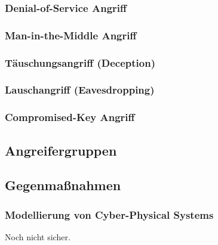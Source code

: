 \documentclass[final,bibliography=totocnumbered]{include/sikseminar}
\begin{document}
\subsubsection{Denial-of-Service Angriff}
\subsubsection{Man-in-the-Middle Angriff}
\subsubsection{T\"auschungsangriff (Deception)} %
\subsubsection{Lauschangriff (Eavesdropping)} %
\subsubsection{Compromised-Key Angriff}

\subsection{Angreifergruppen}\label{subsec:angreifergruppen}


\subsection{Gegenmaßnahmen}\label{subsec:gegenmassnahmen}




\subsubsection{Modellierung von Cyber-Physical Systems}
Noch nicht sicher.
\end{document}
